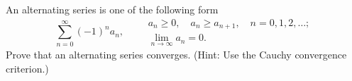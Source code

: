 \begin{exercise}
  \label{ex:hw04:alternating-series}
  An alternating series is one of the following form
  \[
    \sum_{n=0}^{\infty}(-1)^n a_n,
    \qquad
    \begin{gathered}
      a_n\ge0,\quad a_n\ge a_{n+1},\quad n=0,1,2,\ldots;\\
      \lim_{n\to\infty}a_n=0.
    \end{gathered}
  \]
  Prove that an alternating series converges.
  (Hint: Use the Cauchy convergence criterion.)
\end{exercise}
